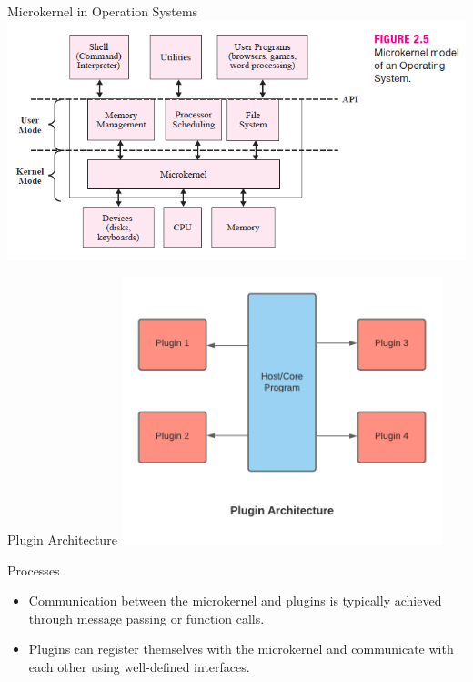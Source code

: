 \documentclass[aspectratio=169, table]{beamer}
\begin{document}
	\begin{frame}{Microkernel in Operation Systems}
		\vspace{20pt}
		\centering		        \includegraphics[width=\textwidth]{../../images/microkernel1}
	\end{frame}
	
	
	\begin{frame}{Plugin Architecture}
		\vspace{30pt}
		\centering
		\includegraphics[width=0.7\textwidth]{../../images/plugin2}
	\end{frame}	
	
	
	\begin{frame}{Processes}
		\begin{itemize}
			\item Communication between the microkernel and plugins is typically achieved through message passing or function calls.
			\item Plugins can register themselves with the microkernel and communicate with each other using well-defined interfaces.
		\end{itemize}
	\end{frame}
	
\end{document}
